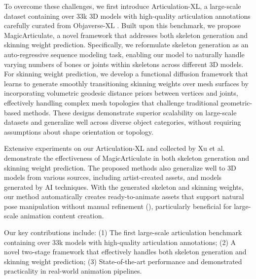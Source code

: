 To overcome these challenges, we first introduce Articulation-XL, a large-scale dataset containing over 33k 3D models with high-quality articulation annotations carefully curated from Objaverse-XL \cite{deitke2023objaverse, deitke2024objaverse}. Built upon this benchmark, we propose MagicArticulate, a novel framework that addresses both skeleton generation and skinning weight prediction. Specifically, we reformulate skeleton generation as an auto-regressive sequence modeling task, enabling our model to naturally handle varying numbers of bones or joints within skeletons across different 3D models. For skinning weight prediction, we develop a functional diffusion framework that learns to generate smoothly transitioning skinning weights over mesh surfaces by incorporating volumetric geodesic distance priors between vertices and joints, effectively handling complex mesh topologies that challenge traditional geometric-based methods. These designs demonstrate superior scalability on large-scale datasets and generalize well across diverse object categories, without requiring assumptions about shape orientation or topology.

Extensive experiments on our Articulation-XL and \res{} \cite{ModelsResource2019} collected by Xu et al. \cite{xu2019predicting, xu2020rignet}
demonstrate the effectiveness of MagicArticulate in both skeleton generation and skinning weight prediction. The proposed methods also generalize well to 3D models from various sources, including artist-created assets, and models generated by AI techniques. With the generated skeleton and skinning weights, our method automatically creates ready-to-animate assets that support natural pose manipulation without manual refinement (), particularly beneficial for large-scale animation content creation. 

Our key contributions include: (1) The first large-scale articulation benchmark containing over 33k models with high-quality articulation annotations; (2) A novel two-stage framework that effectively handles both skeleton generation and skinning weight prediction; (3) State-of-the-art performance and demonstrated practicality in real-world animation pipelines.
